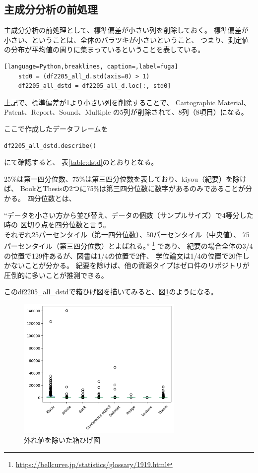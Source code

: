 \documentclass[submit,noauthor]{ono}
\begin{document}
\subsection{主成分分析の前処理}
主成分分析の前処理として、標準偏差が小さい列を削除しておく。
標準偏差が小さい、ということは、全体のバラツキが小さいということ、
つまり、測定値の分布が平均値の周りに集まっているということを表している。

\begin{lstlisting}[language=Python,breaklines, caption=,label=fuga]
	std0 = (df2205_all_d.std(axis=0) > 1)
	df2205_all_dstd = df2205_all_d.loc[:, std0]
\end{lstlisting}

上記で、標準偏差が1より小さい列を削除することで、
Cartographic Material、Patent、Report、Sound、Multiple
の5列が削除されて、8列（8項目）になる。

ここで作成したデータフレームを

\begin{lstlisting}[language=Python,breaklines]
	df2205_all_dstd.describe()
\end{lstlisting}

にて確認すると、
表\ref{table:dstd}のとおりとなる。

25\%は第一四分位数、75\%は第三四分位数を表しており、kiyou（紀要）を除けば、
BookとThesisの2つに75\%は第三四分位数に数字があるのみであることが分かる。
四分位数とは、

“データを小さい方から並び替え、データの個数（サンプルサイズ）で4等分した時の
区切り点を四分位数と言う。\\
それぞれ25パーセンタイル（第一四分位数）、50パーセンタイル（中央値）、
75パーセンタイル（第三四分位数）とよばれる。”
\footnote{\url{https://bellcurve.jp/statistics/glossary/1919.html}}
であり、
紀要の場合全体の3/4の位置で129件あるが、図書は1/4の位置で2件、
学位論文は1/4の位置で20件しかないことが分かる。
紀要を除けば、他の資源タイプはゼロ件のリポジトリが圧倒的に多いことが推測できる。

このdf2205\_all\_dstdで箱ひげ図を描いてみると、図\ref{fig:box1}のようになる。

\begin{figure}[h]
	\includegraphics[width=8cm]{./picture/df2205alldstdboxplot.png}
	\caption{外れ値を除いた箱ひげ図}
	\label{fig:box1}
\end{figure}
\end{document}
